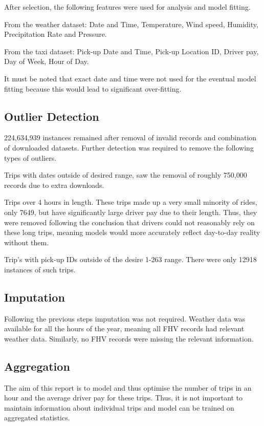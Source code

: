 \documentclass[11pt]{article}
\begin{document}
After selection, the following features were used for analysis and model fitting.

From the weather dataset: Date and Time, Temperature, Wind speed, Humidity, Precipitation Rate and Pressure.

From the taxi dataset: Pick-up Date and Time, Pick-up Location ID, Driver pay, Day of Week, Hour of Day.

It must be noted that exact date and time were not used for the eventual model fitting because this would lead to significant over-fitting.

\subsection{Outlier Detection}

224,634,939 instances remained after removal of invalid records and combination of downloaded datasets. Further detection was required to remove the following types of outliers.

Trips with dates outside of desired range, saw the removal of roughly 750,000 records due to extra downloads.

Trips over 4 hours in length. These trips made up a very small minority of rides, only 7649, but have significantly large driver pay due to their length. Thus, they were removed following the conclusion that drivers could not reasonably rely on these long trips, meaning models would more accurately reflect day-to-day reality without them.

Trip's with pick-up IDs outside of the desire 1-263 range. There were only 12918 instances of such trips.

\subsection{Imputation}

Following the previous steps imputation was not required. Weather data was available for all the hours of the year, meaning all FHV records had relevant weather data. Similarly, no FHV records were missing the relevant information.

\subsection{Aggregation}

The aim of this report is to model and thus optimise the number of trips in an hour and the average driver pay for these trips. Thus, it is not important to maintain information about individual trips and model can be trained on aggregated statistics.
\end{document}
